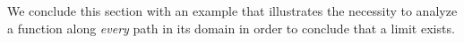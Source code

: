 \documentclass{ximera}
\begin{document}
We conclude this section with an example that illustrates the necessity to analyze a function along \emph{every} path in its domain in order to conclude that a limit exists.

\end{document}
